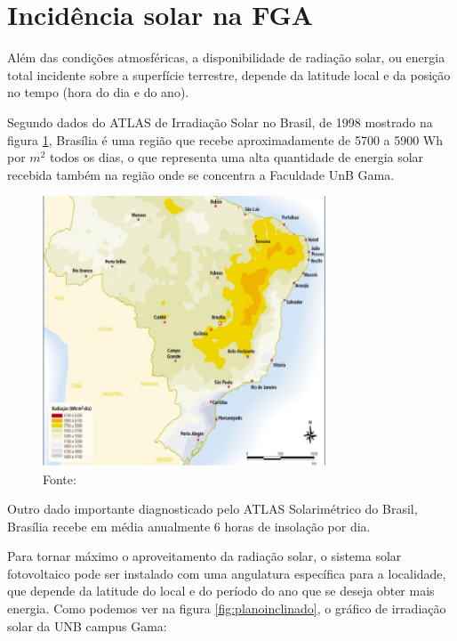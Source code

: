 \section{Incidência solar na FGA}

Além das condições atmosféricas, a disponibilidade de radiação solar, ou energia total incidente sobre a superfície terrestre, depende da latitude local e da posição no tempo (hora do dia e do ano). 

Segundo dados do ATLAS de Irradiação Solar no Brasil, de 1998 mostrado na figura \ref{fig:atlas}, Brasília é uma região que recebe aproximadamente de 5700 a 5900 Wh por $m^{2}$ todos os dias, o que representa uma alta quantidade de energia solar recebida também na região onde se concentra a Faculdade UnB Gama. 

\begin{figure}[!h]
\centering
\includegraphics[width=0.75\textwidth]{figuras/atlas.png}
\caption{Fonte: \cite{colle1998atlas}}
\label{fig:atlas}
\end{figure}

Outro dado importante diagnosticado pelo ATLAS Solarimétrico do Brasil, Brasília recebe em média anualmente 6 horas de insolação por dia. 

Para tornar máximo o aproveitamento da radiação solar, o sistema solar fotovoltaico pode ser instalado com uma angulatura específica para a localidade, que depende da latitude do local e do período do ano que se deseja obter mais energia. Como podemos ver na figura \ref{fig:planoinclinado}, o gráfico de irradiação solar da UNB campus Gama:

